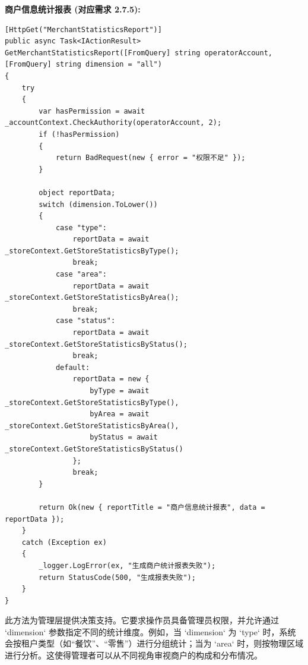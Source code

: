 \documentclass[]{article}
\begin{document}
\textbf{商户信息统计报表 (对应需求 2.7.5):}
\begin{verbatim}
[HttpGet("MerchantStatisticsReport")]
public async Task<IActionResult> GetMerchantStatisticsReport([FromQuery] string operatorAccount, [FromQuery] string dimension = "all")
{
    try
    {
        var hasPermission = await _accountContext.CheckAuthority(operatorAccount, 2);
        if (!hasPermission)
        {
            return BadRequest(new { error = "权限不足" });
        }

        object reportData;
        switch (dimension.ToLower())
        {
            case "type":
                reportData = await _storeContext.GetStoreStatisticsByType();
                break;
            case "area":
                reportData = await _storeContext.GetStoreStatisticsByArea();
                break;
            case "status":
                reportData = await _storeContext.GetStoreStatisticsByStatus();
                break;
            default:
                reportData = new {
                    byType = await _storeContext.GetStoreStatisticsByType(),
                    byArea = await _storeContext.GetStoreStatisticsByArea(),
                    byStatus = await _storeContext.GetStoreStatisticsByStatus()
                };
                break;
        }

        return Ok(new { reportTitle = "商户信息统计报表", data = reportData });
    }
    catch (Exception ex)
    {
        _logger.LogError(ex, "生成商户统计报表失败");
        return StatusCode(500, "生成报表失败");
    }
}
\end{verbatim}
此方法为管理层提供决策支持。它要求操作员具备管理员权限，并允许通过 `dimension` 参数指定不同的统计维度。例如，当 `dimension` 为 `type` 时，系统会按租户类型（如“餐饮”、“零售”）进行分组统计；当为 `area` 时，则按物理区域进行分析。这使得管理者可以从不同视角审视商户的构成和分布情况。
\end{document}
